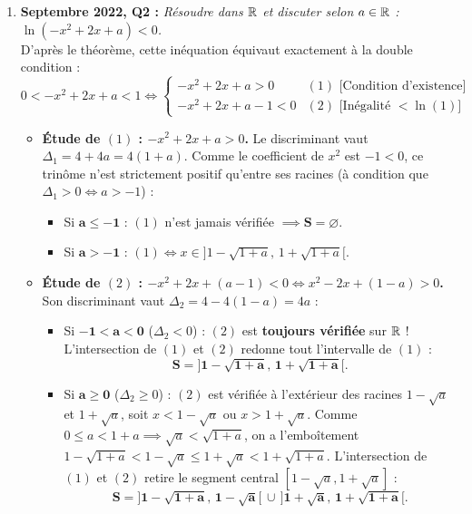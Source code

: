 \begin{exemple}
\begin{enumerate}
    \item \textbf{Septembre 2022, Q2 :} \emph{Résoudre dans $\mathbb{R}$ et discuter selon $a \in \mathbb{R}$ : $\ln(-x^2 + 2x + a) < 0$.}\\
    D'après le théorème, cette inéquation équivaut exactement à la double condition :
    \[
        \boxed{0 < -x^2 + 2x + a < 1} \iff \begin{cases} -x^2 + 2x + a > 0 & (1) \text{ [Condition d'existence]} \\ -x^2 + 2x + a - 1 < 0 & (2) \text{ [Inégalité } < \ln(1)] \end{cases}
    \]
    \begin{itemize}
        \item \textbf{Étude de $(1)$ : $-x^2 + 2x + a > 0$.} Le discriminant vaut $\Delta_1 = 4 + 4a = 4(1 + a)$. Comme le coefficient de $x^2$ est $-1 < 0$, ce trinôme n'est strictement positif qu'entre ses racines (à condition que $\Delta_1 > 0 \iff a > -1$) :
        \begin{itemize}
            \item Si $\mathbf{a \le -1}$ : $(1)$ n'est jamais vérifiée $\implies \mathbf{S = \varnothing}$.
            \item Si $\mathbf{a > -1}$ : $(1) \iff x \in \bigl]1 - \sqrt{1 + a},\, 1 + \sqrt{1 + a}\bigr[$.
        \end{itemize}
        \item \textbf{Étude de $(2)$ : $-x^2 + 2x + (a - 1) < 0 \iff x^2 - 2x + (1 - a) > 0$.} Son discriminant vaut $\Delta_2 = 4 - 4(1 - a) = 4a$ :
        \begin{itemize}
            \item Si $\mathbf{-1 < a < 0}$ ($\Delta_2 < 0$) : $(2)$ est \textbf{toujours vérifiée} sur $\mathbb{R}$ ! L'intersection de $(1)$ et $(2)$ redonne tout l'intervalle de $(1)$ :
            \[
                \mathbf{S = \bigl]1 - \sqrt{1 + a},\, 1 + \sqrt{1 + a}\bigr[}.
            \]
            \item Si $\mathbf{a \ge 0}$ ($\Delta_2 \ge 0$) : $(2)$ est vérifiée à l'extérieur des racines $1 - \sqrt{a}$ et $1 + \sqrt{a}$, soit $x < 1 - \sqrt{a}$ ou $x > 1 + \sqrt{a}$. Comme $0 \le a < 1 + a \implies \sqrt{a} < \sqrt{1 + a}$, on a l'emboîtement $1 - \sqrt{1+a} < 1 - \sqrt{a} \le 1 + \sqrt{a} < 1 + \sqrt{1+a}$. L'intersection de $(1)$ et $(2)$ retire le segment central $[1 - \sqrt{a}, 1 + \sqrt{a}]$ :
            \[
                \mathbf{S = \bigl]1 - \sqrt{1 + a},\, 1 - \sqrt{a}\bigr[ \,\cup\, \bigl]1 + \sqrt{a},\, 1 + \sqrt{1 + a}\bigr[}.
            \]
        \end{itemize}
    \end{itemize}


\end{enumerate}
\end{exemple}
